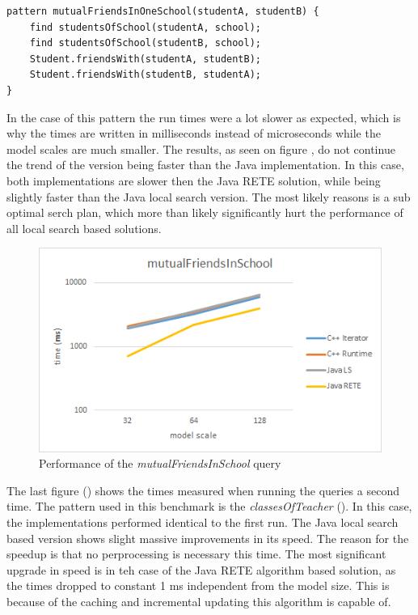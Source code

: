 \begin{lstlisting}[frame=single,float=!ht,language=IQPL,
label=listing:meas_mutualFriendsInSchool, caption=The mutualFriendsInSchool pattern]
pattern mutualFriendsInOneSchool(studentA, studentB) {
	find studentsOfSchool(studentA, school);
	find studentsOfSchool(studentB, school);
	Student.friendsWith(studentA, studentB);
	Student.friendsWith(studentB, studentA);
}
\end{lstlisting}

In the case of this pattern the run times were a lot slower as expected,
which is why the times are written in milliseconds instead of microseconds
while the model scales are much smaller. The results, as seen on figure
, do not continue the trend of the \CPP{}
version being faster than the Java implementation. In this case, both \CPP{}
implementations are slower then the Java RETE solution, while being slightly
faster than the Java local search version. The most likely reasons is a sub
optimal serch plan, which more than likely significantly hurt the performance
of all local search based solutions.

\begin{figure}[!ht]
\centering
\includegraphics[width=120mm,
keepaspectratio]{figures/meas_mutualFriendsInSchool.png}
\caption{Performance of the \emph{mutualFriendsInSchool} query}
\label{fig:meas_mutualFriendsInSchool}
\end{figure}

The last figure () shows the times measured when running
the queries a second time. The pattern used in this benchmark is the
\emph{classesOfTeacher} (). In this case, the
\CPP{} implementations performed identical to the first run. The Java local
search based version shows slight massive improvements in its speed. The reason
for the speedup is that no perprocessing is necessary this time. The most
significant upgrade in speed is in teh case of the Java RETE algorithm based
solution, as the times dropped to constant 1 ms independent from the model size.
This is because of the caching and incremental updating this algorithm is
capable of.

